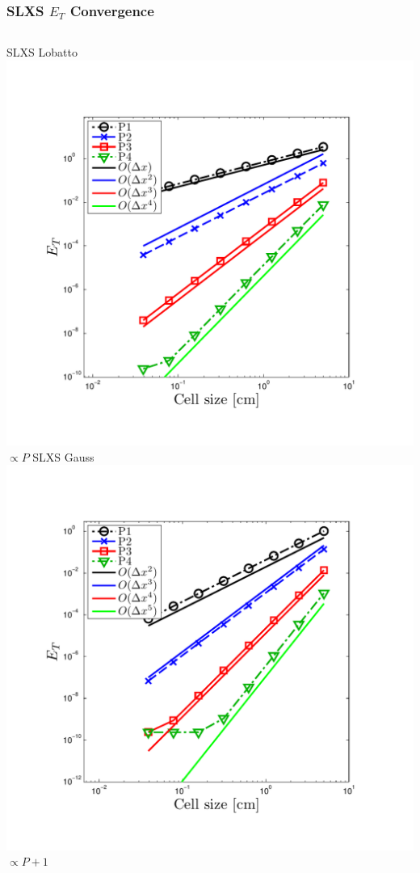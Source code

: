 \documentclass{beamer}
\begin{document}
\begin{frame}
\frametitle{SLXS $E_T$ Convergence}
\begin{columns}[t]
\centering
SLXS Lobatto
\includegraphics[width=\textwidth,trim=0.25in  0.2in 0.75in 0.5in,clip=true]{../chapter6_grey_radtran/Dissertation_Data/MMS3_SLXS_Lobatto_temp_L2.pdf}
\\
$\propto P$
\centering
SLXS Gauss
\includegraphics[width=\textwidth,trim=0.25in  0.2in 0.75in 0.5in,clip=true]{../chapter6_grey_radtran/Dissertation_Data/MMS3_SLXS_Gauss_temp_L2.pdf}
\\
$\propto P+1$
\end{columns}
\end{frame}
\end{document}
